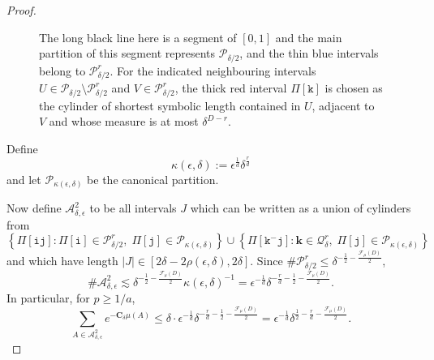 \documentclass[10pt,a4paper]{amsart}
\def\A{\ensuremath{\mathscr A}}
\def\F{\ensuremath{\mathcal F}}
\renewcommand{\i}{\mathtt{i}}
\renewcommand{\j}{\mathtt{j}}
\renewcommand{\k}{\mathtt{k}}
\def\sm{\setminus}
\begin{document}
\begin{proof}
\begin{figure}[h]
  \caption{The long black line here is a segment of $[0, 1]$ and the main partition of this segment represents $\mathscr{P}_{\delta/2}$, and the thin blue intervals belong to $\mathscr{P}_{\delta/2}^r$. For the indicated neighbouring intervals $U\in \mathscr{P}_{\delta/2}\sm \mathscr{P}_{\delta/2}^r$ and $V\in \mathscr{P}_{\delta/2}^r$, the thick red interval $\Pi[\k]$ is chosen as the cylinder of shortest symbolic length contained in $U$, adjacent to $V$ and whose measure is at most $\delta^{D-r}$.}
    \label{fig:k}
\end{figure}

Define 
$$\kappa(\epsilon,\delta):=\epsilon^{\frac{1}{d}}\delta^{\frac{r}{d}}$$
and let $\mathscr{P}_{\kappa(\epsilon,\delta)}$ be the canonical partition.

Now define $\A^2_{\delta,\epsilon}$ to be all intervals $J$ which can be written as a union of cylinders from  
\begin{equation}\label{weirdset}
 \left\{\Pi[\i\j]: \Pi[\i] \in \mathscr{P}_{\delta/2}^r, \;\Pi[\j ]\in \mathscr{P}_{\kappa(\epsilon,\delta)}\right\} \cup \left\{\Pi[\k^-\j]: \mathbf{k} \in \mathcal{Q}_{\delta}^r,\; \Pi[\j] \in \mathscr{P}_{\kappa(\epsilon,\delta)}\right\}
\end{equation}
and which have length $|J| \in [2\delta-2\rho(\epsilon,\delta), 2\delta]$. Since $\#\mathscr{P}_{\delta/2}^r \leq\delta^{-\frac{1}{2}-\frac{\F_\mu(D)}{2}}$,
$$\#\A^2_{\delta,\epsilon} \lesssim\delta^{-\frac{1}{2}-\frac{\F_\mu(D)}{2}}\kappa(\epsilon,\delta)^{-1}=\epsilon^{-\frac{1}{d}} \delta^{-\frac{r}{d}-\frac{1}{2}-\frac{\F_\mu(D)}{2}}.$$
In particular, for $p\ge 1/a$, 
$$\sum_{A \in \A^2_{\delta,\epsilon}} e^{-\mathbf{C}_\delta \mu(A)} \leq\delta \cdot\epsilon^{-\frac{1}{d}} \delta^{-\frac{r}{d}-\frac{1}{2}-\frac{\F_\mu(D)}{2}}=\epsilon^{-\frac{1}{d}} \delta^{\frac{1}{2}-\frac{r}{d}-\frac{\F_\mu(D)}{2}}.$$


\end{proof}
\end{document}
